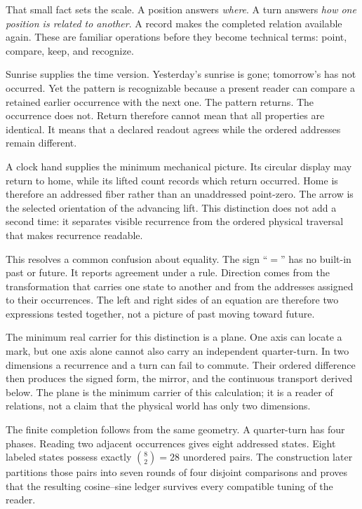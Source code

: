 \documentclass[10pt]{article}
\begin{document}
That small fact sets the scale. A position answers \emph{where}. A turn answers \emph{how one position is related to another}. A record makes the completed relation available again. These are familiar operations before they become technical terms: point, compare, keep, and recognize.

Sunrise supplies the time version. Yesterday's sunrise is gone; tomorrow's has not occurred. Yet the pattern is recognizable because a present reader can compare a retained earlier occurrence with the next one. The pattern returns. The occurrence does not. Return therefore cannot mean that all properties are identical. It means that a declared readout agrees while the ordered addresses remain different.

A clock hand supplies the minimum mechanical picture. Its circular display may return to home, while its lifted count records which return occurred. Home is therefore an addressed fiber rather than an unaddressed point-zero. The arrow is the selected orientation of the advancing lift. This distinction does not add a second time: it separates visible recurrence from the ordered physical traversal that makes recurrence readable.

This resolves a common confusion about equality. The sign ``$=$'' has no built-in past or future. It reports agreement under a rule. Direction comes from the transformation that carries one state to another and from the addresses assigned to their occurrences. The left and right sides of an equation are therefore two expressions tested together, not a picture of past moving toward future.

The minimum real carrier for this distinction is a plane. One axis can locate a mark, but one axis alone cannot also carry an independent quarter-turn. In two dimensions a recurrence and a turn can fail to commute. Their ordered difference then produces the signed form, the mirror, and the continuous transport derived below. The plane is the minimum carrier of this calculation; it is a reader of relations, not a claim that the physical world has only two dimensions.

The finite completion follows from the same geometry. A quarter-turn has four phases. Reading two adjacent occurrences gives eight addressed states. Eight labeled states possess exactly $\binom82=28$ unordered pairs. The construction later partitions those pairs into seven rounds of four disjoint comparisons and proves that the resulting cosine--sine ledger survives every compatible tuning of the reader.
\end{document}
